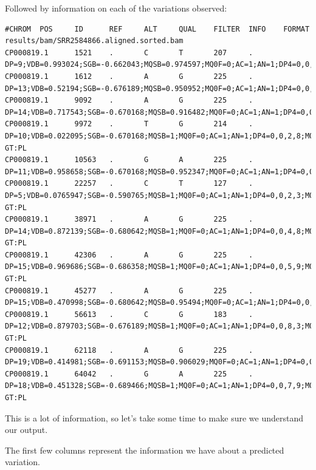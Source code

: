 \documentclass[
  letterpaper,
  DIV=11,
  numbers=noendperiod]{scrreprt}
\begin{document}
Followed by information on each of the variations observed:

\begin{verbatim}
#CHROM  POS     ID      REF     ALT     QUAL    FILTER  INFO    FORMAT  results/bam/SRR2584866.aligned.sorted.bam
CP000819.1      1521    .       C       T       207     .       DP=9;VDB=0.993024;SGB=-0.662043;MQSB=0.974597;MQ0F=0;AC=1;AN=1;DP4=0,0,4,5;MQ=60
CP000819.1      1612    .       A       G       225     .       DP=13;VDB=0.52194;SGB=-0.676189;MQSB=0.950952;MQ0F=0;AC=1;AN=1;DP4=0,0,6,5;MQ=60
CP000819.1      9092    .       A       G       225     .       DP=14;VDB=0.717543;SGB=-0.670168;MQSB=0.916482;MQ0F=0;AC=1;AN=1;DP4=0,0,7,3;MQ=60
CP000819.1      9972    .       T       G       214     .       DP=10;VDB=0.022095;SGB=-0.670168;MQSB=1;MQ0F=0;AC=1;AN=1;DP4=0,0,2,8;MQ=60      GT:PL
CP000819.1      10563   .       G       A       225     .       DP=11;VDB=0.958658;SGB=-0.670168;MQSB=0.952347;MQ0F=0;AC=1;AN=1;DP4=0,0,5,5;MQ=60
CP000819.1      22257   .       C       T       127     .       DP=5;VDB=0.0765947;SGB=-0.590765;MQSB=1;MQ0F=0;AC=1;AN=1;DP4=0,0,2,3;MQ=60      GT:PL
CP000819.1      38971   .       A       G       225     .       DP=14;VDB=0.872139;SGB=-0.680642;MQSB=1;MQ0F=0;AC=1;AN=1;DP4=0,0,4,8;MQ=60      GT:PL
CP000819.1      42306   .       A       G       225     .       DP=15;VDB=0.969686;SGB=-0.686358;MQSB=1;MQ0F=0;AC=1;AN=1;DP4=0,0,5,9;MQ=60      GT:PL
CP000819.1      45277   .       A       G       225     .       DP=15;VDB=0.470998;SGB=-0.680642;MQSB=0.95494;MQ0F=0;AC=1;AN=1;DP4=0,0,7,5;MQ=60
CP000819.1      56613   .       C       G       183     .       DP=12;VDB=0.879703;SGB=-0.676189;MQSB=1;MQ0F=0;AC=1;AN=1;DP4=0,0,8,3;MQ=60      GT:PL
CP000819.1      62118   .       A       G       225     .       DP=19;VDB=0.414981;SGB=-0.691153;MQSB=0.906029;MQ0F=0;AC=1;AN=1;DP4=0,0,8,10;MQ=59
CP000819.1      64042   .       G       A       225     .       DP=18;VDB=0.451328;SGB=-0.689466;MQSB=1;MQ0F=0;AC=1;AN=1;DP4=0,0,7,9;MQ=60      GT:PL
\end{verbatim}

This is a lot of information, so let's take some time to make sure we
understand our output.

The first few columns represent the information we have about a
predicted variation.
\end{document}
